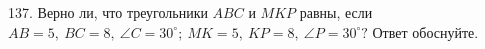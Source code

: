 137. Верно ли, что треугольники $ABC$ и $MKP$ равны, если $AB=5,\ BC=8,\ \angle C=30^\circ;\ MK=5,\ KP=8,\ \angle P=30^\circ?$ Ответ обоснуйте.\\
